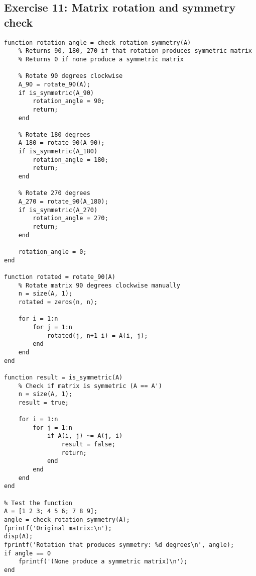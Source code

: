 \documentclass[oneside]{article}
\begin{document}
\subsection*{Exercise 11: Matrix rotation and symmetry check}

\begin{verbatim}
function rotation_angle = check_rotation_symmetry(A)
    % Returns 90, 180, 270 if that rotation produces symmetric matrix
    % Returns 0 if none produce a symmetric matrix
    
    % Rotate 90 degrees clockwise
    A_90 = rotate_90(A);
    if is_symmetric(A_90)
        rotation_angle = 90;
        return;
    end
    
    % Rotate 180 degrees
    A_180 = rotate_90(A_90);
    if is_symmetric(A_180)
        rotation_angle = 180;
        return;
    end
    
    % Rotate 270 degrees
    A_270 = rotate_90(A_180);
    if is_symmetric(A_270)
        rotation_angle = 270;
        return;
    end
    
    rotation_angle = 0;
end

function rotated = rotate_90(A)
    % Rotate matrix 90 degrees clockwise manually
    n = size(A, 1);
    rotated = zeros(n, n);
    
    for i = 1:n
        for j = 1:n
            rotated(j, n+1-i) = A(i, j);
        end
    end
end

function result = is_symmetric(A)
    % Check if matrix is symmetric (A == A')
    n = size(A, 1);
    result = true;
    
    for i = 1:n
        for j = 1:n
            if A(i, j) ~= A(j, i)
                result = false;
                return;
            end
        end
    end
end

% Test the function
A = [1 2 3; 4 5 6; 7 8 9];
angle = check_rotation_symmetry(A);
fprintf('Original matrix:\n');
disp(A);
fprintf('Rotation that produces symmetry: %d degrees\n', angle);
if angle == 0
    fprintf('(None produce a symmetric matrix)\n');
end
\end{verbatim}
\end{document}
